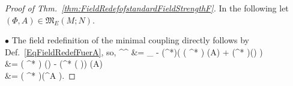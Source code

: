 \begin{proof}[Proof of Thm.~\ref{thm:FieldRedefofstandardFieldStrengthF}]
\leavevmode\newline
In the following let $(\Phi,A) \in \mathfrak{M}_E(M;N)$.

$\bullet$ The field redefinition of the minimal coupling directly follows by Def.~\eqref{EqFieldRedefFuerA}, so,
\bas
{}^{^\lambda} \Phi
&=
_{}
	- (\Phi^*\rho)\bigl( 
		\mleft( \Phi^* \Lambda \mright) (A)
		+ (\Phi^* \lambda)(\Phi) 
	\bigr)
\\
&=
\mleft( \Phi^* \widehat{\Lambda} \mright) (\Phi)
	- \mleft(\Phi^* \mleft(\widehat{\Lambda} \circ \rho\mright)\mright) (A)
\\
&=
\mleft( \Phi^* \widehat{\Lambda} \mright)\mleft(^{A} \Phi\mright).
\eas


\end{proof}
